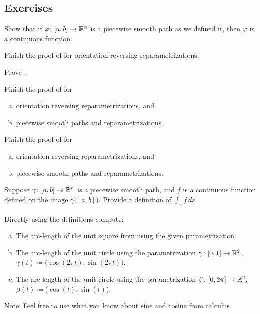 \subsection{Exercises}

\begin{exercise}
Show that if $\varphi \colon [a,b] \to {\mathbb{R}}^n$ is a piecewise smooth path as we
defined it, then $\varphi$ is a continuous function.
\end{exercise}

\begin{exercise}
Finish the proof of  for orientation
reversing reparametrizations.
\end{exercise}

\begin{exercise}
Prove .
\end{exercise}

\begin{exercise} \label{mv:exercise:pathpiece}
Finish the proof of 
for
\begin{enumerate}[a)]
\item
orientation reversing reparametrizations, and
\item
piecewise smooth paths
and reparametrizations.
\end{enumerate}
\end{exercise}

\begin{exercise} \label{mv:exercise:linepiece}
Finish the proof of 
for
\begin{enumerate}[a)]
\item
orientation reversing reparametrizations, and
\item
piecewise smooth paths
and reparametrizations.
\end{enumerate}
\end{exercise}

\begin{exercise}
Suppose $\gamma \colon [a,b] \to {\mathbb{R}}^n$ is a piecewise smooth path, and $f$ is a
continuous function defined on the image $\gamma\bigl([a,b]\bigr)$.
Provide a definition of $\int_{\gamma} f \,ds$.
\end{exercise}

\begin{exercise}
Directly using the definitions compute:
\begin{enumerate}[a)]
\item
The arc-length of the unit square from
 using the given parametrization.
\item
The arc-length of the unit circle using the parametrization
$\gamma \colon [0,1] \to {\mathbb{R}}^2$, $\gamma(t) \coloneqq \bigl(\cos(2\pi t),\sin(2\pi t)\bigr)$.
\item
The arc-length of the unit circle using the parametrization
$\beta \colon [0,2\pi] \to {\mathbb{R}}^2$, $\beta(t) \coloneqq \bigl(\cos(t),\sin(t)\bigr)$.
\end{enumerate}
Note: Feel free to use what you know about sine and cosine from calculus.
\end{exercise}

